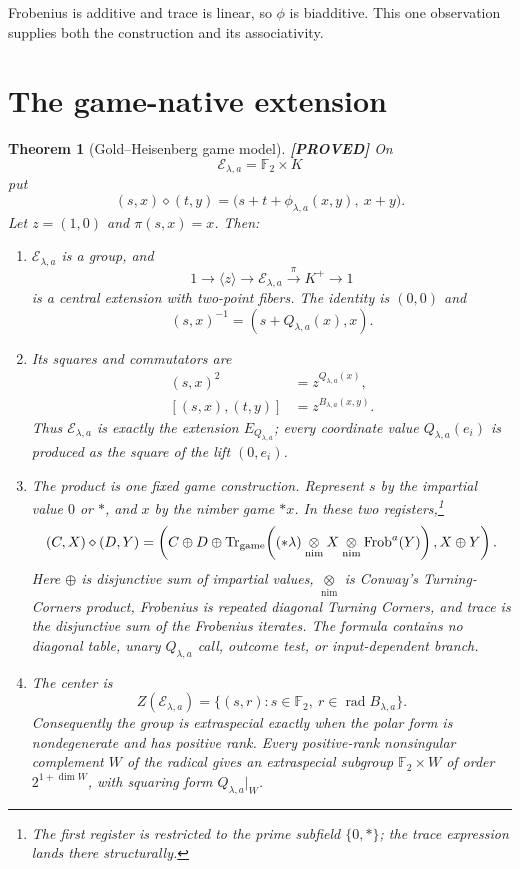 \documentclass[11pt]{article}
\newtheorem{theorem}{Theorem}
\theoremstyle{definition}
\theoremstyle{remark}
\newcommand{\F}{\mathbb{F}}
\newcommand{\Tr}{\operatorname{Tr}}
\newcommand{\nimmul}{\mathbin{\mathop{\otimes}\limits_{\mathrm{nim}}}}
\newcommand{\taglabel}[1]{\textnormal{\textbf{[#1]}}}
\newcommand{\PROVED}{\taglabel{PROVED}}
\begin{document}
Frobenius is additive and trace is linear, so $\phi$ is biadditive.  This
one observation supplies both the construction and its associativity.

\section{The game-native extension}

\begin{theorem}[Gold--Heisenberg game model]\label{thm:model}
\PROVED{}
On
\[
 \mathcal E_{\lambda,a}=\F_2\times K
\]
put
\begin{equation}\label{eq:product}
 (s,x)\diamond(t,y)=
 \bigl(s+t+\phi_{\lambda,a}(x,y),\ x+y\bigr).
\end{equation}
Let $z=(1,0)$ and $\pi(s,x)=x$.  Then:
\begin{enumerate}[label=(\roman*),leftmargin=*]
\item $\mathcal E_{\lambda,a}$ is a group, and
\[
 1\longrightarrow\langle z\rangle\longrightarrow
 \mathcal E_{\lambda,a}\xrightarrow{\ \pi\ }K^+
 \longrightarrow1
\]
is a central extension with two-point fibers.  The identity is $(0,0)$
and
\[
 (s,x)^{-1}=(s+Q_{\lambda,a}(x),x).
\]
\item Its squares and commutators are
\begin{align}
 (s,x)^2&=z^{Q_{\lambda,a}(x)},\label{eq:square}\\
 [(s,x),(t,y)]&=z^{B_{\lambda,a}(x,y)}.\label{eq:comm}
\end{align}
Thus $\mathcal E_{\lambda,a}$ is exactly the extension
$E_{Q_{\lambda,a}}$; every coordinate value $Q_{\lambda,a}(e_i)$ is
produced as the square of the lift $(0,e_i)$.
\item The product is one fixed game construction.  Represent $s$ by the
impartial value $0$ or $\ast$, and $x$ by the nimber game $\ast x$.  In
these two registers,\footnote{The first register is restricted to the
prime subfield $\{0,\ast\}$; the trace expression lands there
structurally.}
\begin{equation}\label{eq:gameproduct}
 (C,X)\diamond(D,Y)=
 \left(C\oplus D\oplus
 \Tr_{\rm game}\!\left(
 (\ast\lambda)\nimmul X\nimmul\operatorname{Frob}^{a}(Y)\right),
 X\oplus Y\right).
\end{equation}
Here $\oplus$ is disjunctive sum of impartial values,
$\nimmul$ is Conway's Turning-Corners product, Frobenius is repeated
diagonal Turning Corners, and trace is the disjunctive sum of the
Frobenius iterates.  The formula contains no diagonal table, unary
$Q_{\lambda,a}$ call, outcome test, or input-dependent branch.
\item The center is
\[
 Z(\mathcal E_{\lambda,a})=
 \{(s,r):s\in\F_2,\ r\in\operatorname{rad}B_{\lambda,a}\}.
\]
Consequently the group is extraspecial exactly when the polar form is
nondegenerate and has positive rank.  Every positive-rank nonsingular
complement $W$ of the radical gives an extraspecial subgroup
$\F_2\times W$ of order $2^{1+\dim W}$, with squaring form
$Q_{\lambda,a}|_W$.
\end{enumerate}
\end{theorem}
\end{document}
